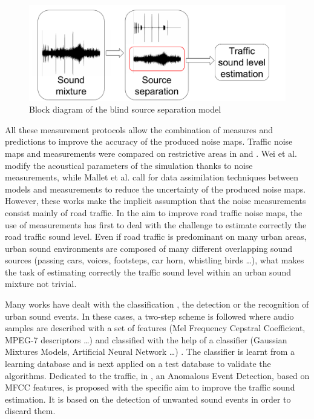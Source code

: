 \documentclass[review,5p,twocolumn,sort&compress,times]{elsarticle}
\begin{document}
\begin{figure}[t]
\centering
\includegraphics[width=.9\linewidth]{figures/bloc_diagram_source_separation.pdf}
\caption{Block diagram of the blind source separation model}
\label{fig:source_separation}
\end{figure}

All these measurement protocols allow the combination of measures and predictions to improve the accuracy of the produced noise maps. Traffic noise maps and measurements were compared on restrictive areas in \cite{lefebvre2017traffic} and \cite{mioduszewski2011noise}. Wei et al. \cite{wei_dynamic_2016} modify the acoustical parameters of the simulation thanks to noise measurements, while  Mallet et al. \cite{ventura2017estimation} call for data assimilation techniques between models and measurements to reduce the uncertainty of the produced noise maps. However, these works make the implicit assumption that the noise measurements consist mainly of road traffic. In the aim to improve road traffic noise maps, the use of measurements has first to deal with the challenge to estimate correctly the road traffic sound level.
Even if road traffic is predominant on many urban areas, urban sound environments are composed of many different overlapping sound sources (passing cars, voices, footsteps, car horn, whistling birds \dots), what makes the task of estimating correctly the traffic sound level within an urban sound mixture not trivial.

Many works have dealt with the classification \cite{valero2012hierarchical,shen_environmental_2012}, the detection \cite{luitel2016sound,mesaros2015sound} or the recognition \cite{defreville_automatic_2006,parascandolo_recurrent_2016} of urban sound events. In these cases, a two-step scheme is followed where audio samples are described with a set of features (Mel Frequency Cepstral Coefficient, MPEG-7 descriptors \dots) and classified with the help of a classifier (Gaussian Mixtures Models, Artificial Neural Network \dots) \cite{chu2008environmental, cowling_comparison_2003}. The classifier is learnt from a learning database and is next applied on a test database to validate the algorithms.
Dedicated to the traffic, in \cite{socoro_anomalous_2017}, an Anomalous Event Detection, based on MFCC features, is proposed with the specific aim to improve the traffic sound estimation. It is based on the detection of unwanted sound events in order to discard them.
\end{document}
